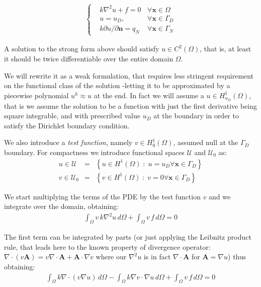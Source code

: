 \documentclass{digitaldynamics}
\def\vect#1{\bm{#1}}
\begin{document}
\begin{align}
\boxed{
	\left\{
	\begin{aligned}
			& k\nabla^2 u + f = 0	& \forall \vect{x}\in\Omega \\ 
			& u=u_D, \; 					& \forall \vect{x}\in\Gamma_D \\
			& k\partial{u}/\partial{\vect{n}}=q_N \; & \forall \vect{x}\in\Gamma_N
	\end{aligned}
	\right.
	\label{eq:strongpoisson}
	}
\end{align}

A solution to the strong form above should satisfy $u \in C^2(\Omega)$, that is, at least it should be twice differentiable over the entire domain $\Omega$. 

We will rewrite it as a weak formulation, that requires less stringent requirement on the functional class of the solution -letting it to be approximated by a piecewise polynomial $u^h \approx u$ at the end. In fact we will assume a $u \in H^1_{u_D}(\Omega)$, that is we assume the solution to be a function with just the first derivative being square integrable, and with prescribed value $u_D$ at the boundary in order to satisfy the Dirichlet boundary condition.

We also introduce a \textit{test function}, namely $v \in H^1_0(\Omega)$, assumed null at the $\Gamma_D$ boundary. 
For compactness we introduce functional spaces $\mathcal{U}$ and $\mathcal{U}_0$ as:
\begin{align}
	u \in \mathcal{U}   &=& \left\{  u \in H^1(\Omega) \; : \; u=u_D \forall \vect{x} \in \Gamma_D \right\} \\
	v \in \mathcal{U}_0 &=& \left\{  v \in H^1(\Omega) \; : \; v=0   \forall \vect{x} \in \Gamma_D \right\}
\end{align}



We start multiplying the terms of the PDE by the test function $v$ and we integrate over the domain, obtaining:
\begin{align}
	\int_\Omega v \, k\nabla^2 u  \, d\Omega + \int_\Omega  v \, f \, d\Omega = 0
	\label{eq:weakpoisson01}
\end{align}

The first term can be integrated by parts (or just applying the Leibnitz product rule, that leads here to the known property of divergence operator: $\nabla\cdot\left(v\mathbf{A}\right)= v\nabla\cdot\mathbf{A}+\mathbf{A}\cdot\nabla v$ where our $\nabla^2 u$ is in fact $\nabla\cdot\mathbf{A}$ for $\mathbf{A}=\nabla u$) thus obtaining:
\begin{align}
	\int_\Omega k \nabla \cdot (v \nabla u)  \,d\Omega - \int_\Omega k \nabla v \cdot \nabla u \,d\Omega    + \int_\Omega  v \, f  \,d\Omega = 0
	\label{eq:weakpoisson02}
\end{align}
\end{document}
